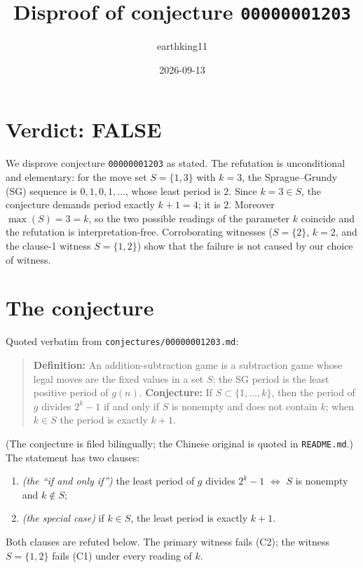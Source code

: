 \documentclass[11pt]{article}
\title{Disproof of conjecture \texttt{00000001203}}
\author{earthking11}
\date{2026-09-13}
\theoremstyle{definition}
\theoremstyle{remark}
\begin{document}
\maketitle

\section*{Verdict: FALSE}

We disprove conjecture \texttt{00000001203} as stated. The refutation is
unconditional and elementary: for the move set $S = \{1,3\}$ with $k = 3$, the
Sprague--Grundy (SG) sequence is $0,1,0,1,\dots$, whose least period is $2$. Since
$k = 3 \in S$, the conjecture demands period exactly $k+1 = 4$; it is $2$.
Moreover $\max(S) = 3 = k$, so the two possible readings of the parameter $k$
coincide and the refutation is interpretation-free. Corroborating witnesses
($S = \{2\}$, $k = 2$, and the clause-1 witness $S = \{1,2\}$) show that the
failure is not caused by our choice of witness.

\section{The conjecture}

Quoted verbatim from \texttt{conjectures/00000001203.md}:

\begin{quote}
\textbf{Definition:} An addition-subtraction game is a subtraction game whose
legal moves are the fixed values in a set $S$; the SG period is the least
positive period of $g(n)$. \textbf{Conjecture:} If $S \subset \{1,\dots,k\}$,
then the period of $g$ divides $2^k-1$ if and only if $S$ is nonempty and does
not contain $k$; when $k \in S$ the period is exactly $k+1$.
\end{quote}

\noindent (The conjecture is filed bilingually; the Chinese original is quoted
in \texttt{README.md}.) The statement has two clauses:

\begin{enumerate}
\item[(C1)] \emph{(the ``if and only if'')} the least period of $g$ divides
  $2^k - 1$ \quad $\Longleftrightarrow$ \quad $S$ is nonempty and $k \notin S$;
\item[(C2)] \emph{(the special case)} if $k \in S$, the least period is exactly
  $k + 1$.
\end{enumerate}

Both clauses are refuted below. The primary witness fails (C2); the witness
$S=\{1,2\}$ fails (C1) under every reading of $k$.
\end{document}
